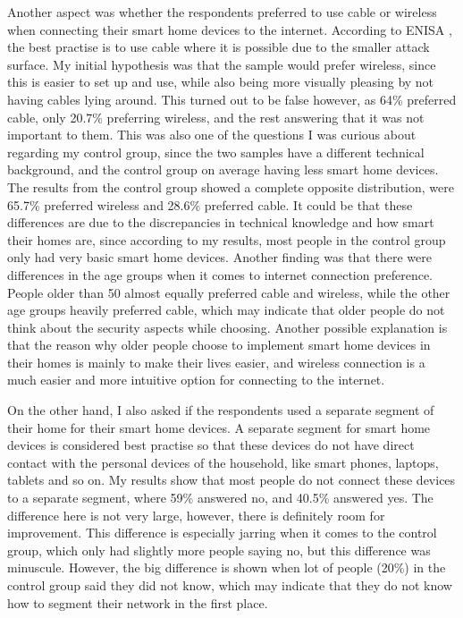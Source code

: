 Another aspect was whether the respondents preferred to use cable or wireless when connecting their smart home devices to the internet. According to ENISA \cite{ENISA2015SmartHome}, the best practise is to use cable where it is possible due to the smaller attack surface. My initial hypothesis was that the sample would prefer wireless, since this is easier to set up and use, while also being more visually pleasing by not having cables lying around. This turned out to be false however, as 64\% preferred cable, only 20.7\% preferring wireless, and the rest answering that it was not important to them. This was also one of the questions I was curious about regarding my control group, since the two samples have a different technical background, and the control group on average having less smart home devices. The results from the control group showed a complete opposite distribution, were 65.7\% preferred wireless and 28.6\% preferred cable. It could be that these differences are due to the discrepancies in technical knowledge and how smart their homes are, since according to my results, most people in the control group only had very basic smart home devices. Another finding was that there were differences in the age groups when it comes to internet connection preference. People older than 50 almost equally preferred cable and wireless, while the other age groups heavily preferred cable, which may indicate that older people do not think about the security aspects while choosing. Another possible explanation is that the reason why older people choose to implement smart home devices in their homes is mainly to make their lives easier, and wireless connection is a much easier and more intuitive option for connecting to the internet. 

On the other hand, I also asked if the respondents used a separate segment of their home for their smart home devices. A separate segment for smart home devices is considered best practise so that these devices do not have direct contact with the personal devices of the household, like smart phones, laptops, tablets and so on. My results show that most people do not connect these devices to a separate segment, where 59\% answered no, and 40.5\% answered yes. The difference here is not very large, however, there is definitely room for improvement. This difference is especially jarring when it comes to the control group, which only had slightly more people saying no, but this difference was minuscule. However, the big difference is shown when lot of people (20\%) in the control group said they did not know, which may indicate that they do not know how to segment their network in the first place. 

